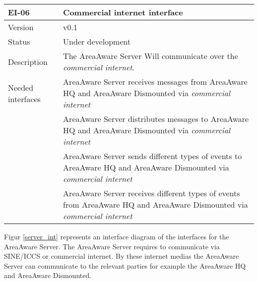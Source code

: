 \begin{longtable}{| p{3.5cm} |  p{10cm} | }
	\hline
	\textbf{EI-06} &  \textbf{Commercial internet interface} \\
	\hline
	Version & v0.1 \\
	\hline
	Status & Under development \\
	\hline
	Description & The AreaAware Server Will communicate over the \emph{commercial internet}.
	\\
	\hline
	Needed interfaces 
	& AreaAware Server receives messages from AreaAware HQ and AreaAware Dismounted via \emph{commercial internet} \\
	& AreaAware Server distributes messages to AreaAware HQ and AreaAware Dismounted via \emph{commercial internet} \\ 
	& AreaAware Server sends different types of events to AreaAware HQ and AreaAware Dismounted via \emph{commercial internet} \\
	& AreaAware Server receives different types of events from AreaAware HQ and AreaAware Dismounted via \emph{commercial internet} \\
	\hline
\end{longtable}


Figur \ref{server_int} represents an interface diagram of the interfaces for the AreaAware Server. The AreaAware Server requires to communicate via SINE/ICCS or commercial internet. By these internet medias the AreaAware Server can communicate to the relevant parties for example the AreaAware HQ and AreaAware Dismounted.
